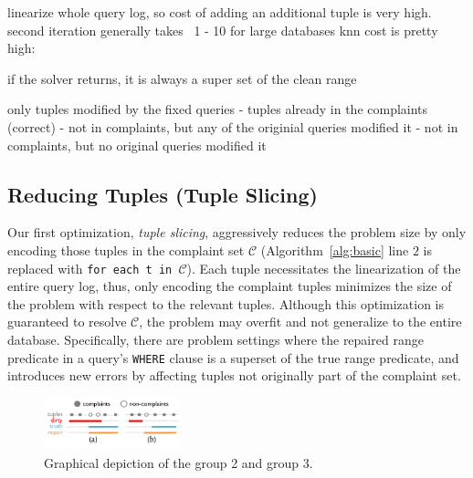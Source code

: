 

linearize whole query log, so cost of adding an additional tuple is very high.
second iteration generally takes ~1 - 10%
for large databases knn cost is pretty high: ~

if the solver returns, it is always a super set of the clean range

only tuples modified by the fixed queries
- tuples already in the complaints (correct)
- not in complaints, but any of the originial queries modified it
- not in complaints, but no original queries modified it
\fi



\subsection{Reducing Tuples (Tuple Slicing)}
\label{sec:opt:tbsize}

Our first optimization, \emph{tuple slicing}, aggressively reduces the problem size by only encoding those 
tuples in the complaint set $\mathcal{C}$ (Algorithm~\ref{alg:basic} line $2$ 
is replaced with \texttt{for each t in $\mathcal{C}$}). Each tuple necessitates
the linearization of the entire query log, thus, only encoding the complaint tuples minimizes the 
size of the problem with respect to the relevant tuples.
Although this optimization is guaranteed to resolve $\mathcal{C}$, the problem may overfit 
and not generalize to the entire database.
Specifically, there are problem settings where the repaired range predicate in a query's \texttt{WHERE} clause is a superset of 
the true range predicate, and introduces new errors by affecting tuples not originally part of  the complaint set.

\begin{figure}[t]
    \centering
    \includegraphics[width=0.35\textwidth]{figures/2nditerationgroups}
    \vspace*{-.2in}
    \caption{Graphical depiction of the group 2 and group 3. }
    \label{fig:groups}
    \vspace*{-.2in}
\end{figure}

